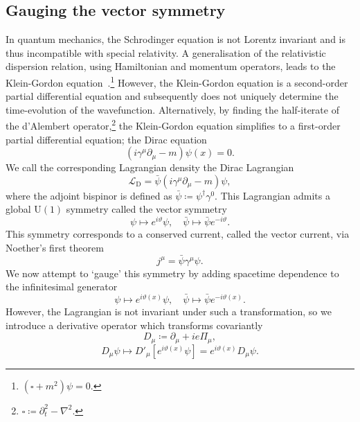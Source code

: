 \documentclass[11pt, a4paper]{article}
\begin{document}
\subsection{Gauging the vector symmetry}
In quantum mechanics, the Schrodinger equation is not Lorentz invariant and is thus
incompatible with special relativity. A generalisation of the relativistic
dispersion relation, using Hamiltonian and momentum operators, leads to the Klein-Gordon
equation~\cite{Klein-tran, Gordon1926}.\footnote{$(\square + m^2)\psi = 0$.}
However, the Klein-Gordon equation is a second-order partial differential equation and
subsequently does not uniquely determine the time-evolution of the wavefunction.
Alternatively, by finding the half-iterate of the d'Alembert
operator,\footnote{$\square \coloneq \partial^2_t - \nabla^2$.} the 
Klein-Gordon equation simplifies to a first-order partial differential equation;
the Dirac equation~\cite{dirac1958}
\begin{equation}
  (i \gamma^\mu\partial_\mu - m)\psi(x) = 0.
\end{equation}
We call the corresponding Lagrangian density the Dirac Lagrangian
\begin{equation}
  \mathcal{L}_\mathrm{D} = \bar{\psi}(i \gamma^\mu\partial_\mu - m)\psi,
\end{equation}
where the adjoint bispinor is defined as $\bar{\psi} \coloneq \psi^\dagger\gamma^0$.
This Lagrangian admits a global $\mathrm{U}(1)$ symmetry called the vector symmetry
\begin{equation}
  \psi \mapsto e^{i\vartheta}\psi, \quad \bar{\psi} \mapsto \bar{\psi}e^{-i\vartheta}.
\end{equation}
This symmetry corresponds to a conserved current, called the vector current,
via Noether's first theorem
\begin{equation}
  j^\mu = \bar{\psi}\gamma^\mu\psi.
\end{equation}
We now attempt to `gauge' this symmetry by adding spacetime dependence
to the infinitesimal generator
\begin{equation}
  \psi \mapsto e^{i\vartheta(x)}\psi, \quad \bar{\psi} \mapsto \bar{\psi}e^{-i\vartheta(x)}.
\end{equation}
However, the Lagrangian is not invariant under such a transformation, so we introduce a
derivative operator which transforms covariantly
\begin{equation}\label{eq:3}
  D_\mu \coloneq \partial_\mu + ie\Pi_\mu,
\end{equation}
\begin{equation}
  D_\mu \psi \mapsto D'_\mu\left[e^{i\vartheta(x)}\psi\right] = e^{i\vartheta(x)}D_\mu\psi.
\end{equation}
\end{document}

